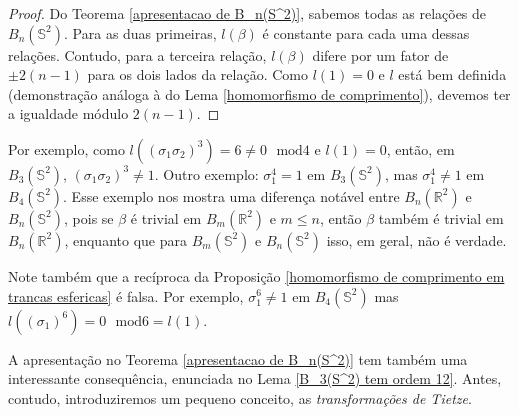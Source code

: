 	\begin{proof}
		Do Teorema \eqref{apresentacao de B_n(S^2)}, sabemos todas as relações de $B_n(\mathbb{S}^2)$. Para as duas primeiras, $l(\beta)$ é constante para cada uma dessas relações. Contudo, para a terceira relação, $l(\beta)$ difere por um fator de $\pm2(n-1)$ para os dois lados da relação. Como $l(1) = 0$ e $l$ está bem definida (demonstração análoga à do Lema \eqref{homomorfismo de comprimento}), devemos ter a igualdade módulo $2(n-1)$.
	\end{proof}
	
	\par\vspace{0.3cm} Por exemplo, como $l((\sigma_1\sigma_2)^3) = 6\neq 0\text{ }\mathrm{mod}4$ e $l(1) = 0$, então, em $B_3(\mathbb{S}^2)$, $(\sigma_1\sigma_2)^3\neq 1$. Outro exemplo: $\sigma_1^4=1$ em $B_3(\mathbb{S}^2)$, mas $\sigma_1^4\neq1$ em $B_4(\mathbb{S}^2)$. Esse exemplo nos mostra uma diferença notável entre $B_n(\mathbb{R}^2)$ e $B_n(\mathbb{S}^2)$, pois se $\beta$ é trivial em $B_m(\mathbb{R}^2)$ e $m\leq n$, então $\beta$ também é trivial em $B_n(\mathbb{R}^2)$, enquanto que para $B_m(\mathbb{S}^2)$ e $B_n(\mathbb{S}^2)$ isso, em geral, não é verdade.
	\par\vspace{0.3cm} Note também que a recíproca da Proposição \eqref{homomorfismo de comprimento em trancas esfericas} é falsa. Por exemplo, $\sigma_1^6\neq1$ em $B_4(\mathbb{S}^2)$ mas $l((\sigma_1)^6) = 0\text{ }\mathrm{mod}6 = l(1)$.
	\par\vspace{0.3cm} A apresentação no Teorema \eqref{apresentacao de B_n(S^2)} tem também uma interessante consequência, enunciada no Lema \eqref{B_3(S^2) tem ordem 12}. Antes, contudo, introduziremos um pequeno conceito, as \textit{transformações de Tietze}.

